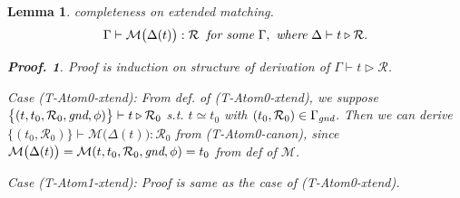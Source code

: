 \documentclass[12pt]{article}
\newtheorem{Lemma}{Lemma}[section]
\newtheorem{Proof}{Proof.}
\begin{document}
\begin{Lemma}{completeness on extended matching.}
  \label{completeness_on_extended_matching}
  \[ \Gamma \vdash \mathcal{M}\bigl( \Delta(t) \bigr) : \mathcal{R}\;\;
      \text{\it for some}\ \Gamma,\ \text{\it where}\
       \Delta \vdash t \triangleright \mathcal{R}.
  \]
  \begin{Proof}
    Proof is induction on structure of derivation of
    $\Gamma \vdash t \triangleright \mathcal{R}$.
    
    Case (T-Atom0-xtend): From def. of (T-Atom0-xtend), we suppose
    $\bigl\{(t, t_0, \mathcal{R}_0, \text{\it gnd}, \phi) \bigr\} \vdash
    t \triangleright \mathcal{R}_0$ s.t. $t \simeq t_0$ with
    $(t_0, \mathcal{R}_0) \in \Gamma_\text{\it gnd}$. Then
    we can derive $\bigl\{(t_0, \mathcal{R}_0) \bigr\} \vdash
    \mathcal{M}\bigl(\Delta(t) \bigr): \mathcal{R}_0$
    from (T-Atom0-canon), since
    $\mathcal{M}\bigl(\Delta(t) \bigr) = \mathcal{M}(t, t_0, \mathcal{R}_0,
    \text{\it gnd}, \phi) = t_0$ from def of $\mathcal{M}$.
    
    Case (T-Atom1-xtend): Proof is same as the case of (T-Atom0-xtend).
    

\end{Proof}
\end{Lemma}
\end{document}
